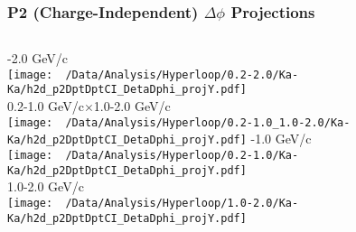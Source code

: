 \documentclass{beamer}
\begin{document}
\begin{frame}
	\frametitle{P2 (Charge-Independent) $\Delta\phi$ Projections}
	\begin{columns}
		-2.0 GeV/c\\
		\texttt{[image: ~/Data/Analysis/Hyperloop/0.2-2.0/Ka-Ka/h2d\_p2DptDptCI\_DetaDphi\_projY.pdf]}\\0.2-1.0 GeV/c$\times$1.0-2.0 GeV/c\\
		\texttt{[image: ~/Data/Analysis/Hyperloop/0.2-1.0\_1.0-2.0/Ka-Ka/h2d\_p2DptDptCI\_DetaDphi\_projY.pdf]}
		-1.0 GeV/c\\
		\texttt{[image: ~/Data/Analysis/Hyperloop/0.2-1.0/Ka-Ka/h2d\_p2DptDptCI\_DetaDphi\_projY.pdf]}\\1.0-2.0 GeV/c\\
		\texttt{[image: ~/Data/Analysis/Hyperloop/1.0-2.0/Ka-Ka/h2d\_p2DptDptCI\_DetaDphi\_projY.pdf]}
	\end{columns}
\end{frame}
\end{document}

